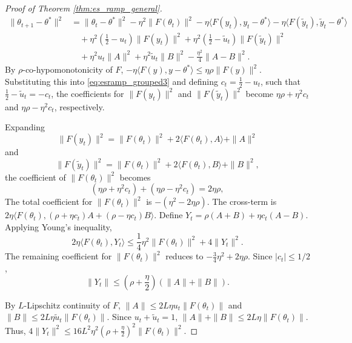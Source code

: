 \documentclass[10pt,a4paper]{amsart}
\begin{document}
\begin{proof}[Proof of Theorem \ref{thm:es_ramp_general}]
\begin{equation}
\begin{aligned}
\|\theta_{t+1} - \theta^*\|^2 &= \|\theta_t - \theta^*\|^2 - \eta^2 \|F(\theta_t)\|^2 - \eta \langle F(y_t), y_t - \theta^* \rangle - \eta \langle F(\tilde{y}_t), \tilde{y}_t - \theta^* \rangle \\
&\quad + \eta^2 \left(\frac{1}{2} - u_t\right)\|F(y_t)\|^2 + \eta^2 \left(\frac{1}{2} - \tilde{u}_t\right)\|F(\tilde{y}_t)\|^2 \\
&\quad + \eta^2 u_t \|A\|^2 + \eta^2 \tilde{u}_t \|B\|^2 - \frac{\eta^2}{4} \|A - B\|^2.
\end{aligned}
\end{equation}
By $\rho$-co-hypomonotonicity of $F$, $-\eta \langle F(y), y - \theta^* \rangle \le \eta\rho \|F(y)\|^2$. Substituting this into \eqref{eq:esramp_grouped3} and defining $c_t = \frac{1}{2} - u_t$, such that $\frac{1}{2} - \tilde{u}_t = -c_t$, the coefficients for $\|F(y_t)\|^2$ and $\|F(\tilde{y}_t)\|^2$ become $\eta\rho + \eta^2 c_t$ and $\eta\rho - \eta^2 c_t$, respectively.

Expanding 
\begin{equation}
 \|F(y_t)\|^2 = \|F(\theta_t)\|^2 + 2\langle F(\theta_t), A \rangle + \|A\|^2
\end{equation}
and
\begin{equation}
 \|F(\tilde{y}_t)\|^2 = \|F(\theta_t)\|^2 + 2\langle F(\theta_t), B \rangle + \|B\|^2,
\end{equation}
the coefficient of $\|F(\theta_t)\|^2$ becomes 
\begin{equation}
 (\eta\rho + \eta^2 c_t) + (\eta\rho - \eta^2 c_t) = 2\eta\rho,
\end{equation}
The total coefficient for $\|F(\theta_t)\|^2$ is $-( \eta^2 - 2\eta\rho )$.
The cross-term is $2\eta \langle F(\theta_t), (\rho + \eta c_t)A + (\rho - \eta c_t)B \rangle$. Define $Y_t = \rho(A+B) + \eta c_t (A-B)$. Applying Young's inequality,
\begin{equation}
 2\eta \langle F(\theta_t), Y_t \rangle \le \frac{1}{4} \eta^2 \|F(\theta_t)\|^2 + 4 \|Y_t\|^2. 
\end{equation}
The remaining coefficient for $\|F(\theta_t)\|^2$ reduces to $-\frac{3}{4}\eta^2 + 2\eta\rho$. Since $|c_t| \le 1/2$, 
\begin{equation}
 \|Y_t\| \le (\rho + \frac{\eta}{2})(\|A\| + \|B\|).
\end{equation}

By $L$-Lipschitz continuity of $F$, $\|A\| \le 2L\eta u_t \|F(\theta_t)\|$ and $\|B\| \le 2L\eta \tilde{u}_t \|F(\theta_t)\|$. Since $u_t + \tilde{u}_t = 1$, $\|A\| + \|B\| \le 2L\eta \|F(\theta_t)\|$. Thus, $4\|Y_t\|^2 \le 16L^2\eta^2(\rho + \frac{\eta}{2})^2 \|F(\theta_t)\|^2$.


\end{proof}
\end{document}
